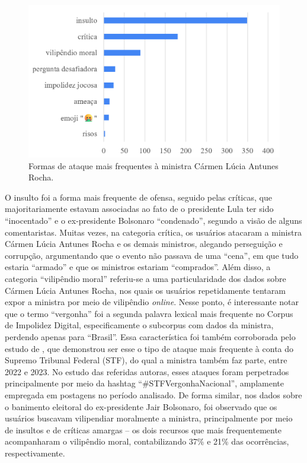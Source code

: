 \documentclass[portuguese]{textolivre}
\begin{document}
\begin{figure}[h!]
\centering
\begin{minipage}{.70\textwidth}
\includegraphics[width =\textwidth]{Fig7.png}
\caption{Formas de ataque mais frequentes à ministra Cármen Lúcia Antunes Rocha.}
\label{graf-5}
\end{minipage}
\end{figure}

O insulto foi a forma mais frequente de ofensa, seguido pelas críticas, que majoritariamente estavam associadas ao fato de o presidente Lula ter sido ``inocentado'' e o ex-presidente Bolsonaro ``condenado'', segundo a visão de alguns comentaristas. Muitas vezes, na categoria crítica, os usuários atacaram a ministra Cármen Lúcia Antunes Rocha e os demais ministros, alegando perseguição e corrupção, argumentando que o evento não passava de uma ``cena'', em que tudo estaria ``armado'' e que os ministros estariam ``comprados''. Além disso, a categoria ``vilipêndio moral'' referiu-se a uma particularidade dos dados sobre Cármen Lúcia Antunes Rocha, nos quais os usuários repetidamente tentaram expor a ministra por meio de vilipêndio \textit{online}. Nesse ponto, é interessante notar que o termo ``vergonha'' foi a segunda palavra lexical mais frequente no Corpus de Impolidez Digital, especificamente o subcorpus com dados da ministra, perdendo apenas para ``Brasil''. Essa característica foi também corroborada pelo estudo de \textcite{oliveira2024}, que demonstrou ser esse o tipo de ataque mais frequente à conta do Supremo Tribunal Federal (STF), do qual a ministra também faz parte, entre 2022 e 2023. No estudo das referidas autoras, esses ataques foram perpetrados principalmente por meio da hashtag ``\#STFVergonhaNacional'', amplamente empregada em postagens no período analisado. De forma similar, nos dados sobre o banimento eleitoral do ex-presidente Jair Bolsonaro, foi observado que os usuários buscavam vilipendiar moralmente a ministra, principalmente por meio de insultos e de críticas amargas – os dois recursos que mais frequentemente acompanharam o vilipêndio moral, contabilizando 37\% e 21\% das ocorrências, respectivamente.
\end{document}
